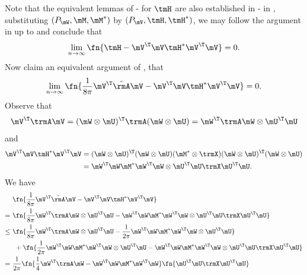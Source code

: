 \begin{proofof}{}
Note that the equivalent lemmas of -  for $\tmH$ are also established in  -  in , substituting $(P_\mW, \mM, \mM^*)$ by $(P_\mV, \tmH, \tmH^*)$, we may follow the argument in  up to  and conclude that
\begin{equation}
\label{eqn:H-equal-VTVHVTV}
    \lim_{n\to\infty}\fn{\tmH-\mV^\T\mV\tmH^*\mV^\T\mV} = 0.
\end{equation}
Now claim an equivalent argument of , that
\begin{equation}
\label{eqn:VTVHVTV-equal-VTAV}
    \lim_{n\to\infty}\fn{\frac{1}{8\pi}\mV^\T\tilde{\rmA}\mV - \mV^\T\mV\tmH^*\mV^\T\mV} = 0.
\end{equation}
Observe that 
\begin{equation}
\begin{split}
\mV^\T\trmA\mV
=(\mW\otimes\mU)^\T\trmA(\mW\otimes\mU) =  \mW^\T\trmA\mW\otimes\mU^\T\mU
\end{split}
\end{equation}
and
\begin{equation}
\begin{split}
\mV^\T\mV\tmH^*\mV^\T\mV &= (\mW\otimes\mU)^\T(\mW\otimes\mU)(\mM^*\otimes\trmX)(\mW\otimes\mU)^\T(\mW\otimes\mU)\\
&=\mW^\T\mW\mM^*\mW^\T\mW\otimes\mU^\T\mU\trmX\mU^\T\mU.
\end{split}
\end{equation}
We have\begin{equation}
\label{eqn:proof-VTVHVTV-equal-VTAV}
\begin{split}
    & \fn{\frac{1}{8\pi}\mV^\T\tilde{\rmA}\mV - \mV^\T\mV\tmH^*\mV^\T\mV}\\
    =\ &\fn{\frac{1}{8\pi}\mW^\T\trmA\mW\otimes\mU^\T\mU - \mW^\T\mW\mM^*\mW^\T\mW\otimes\mU^\T\mU\trmX\mU^\T\mU}\\
    \leq\ &\fn{\frac{1}{8\pi}\mW^\T\trmA\mW\otimes\mU^\T\mU - \frac{1}{2\pi}\mW^\T\mW\mM^*\mW^\T\mW\otimes\mU^\T\mU}\\
    &\ +\fn{\frac{1}{2\pi}\mW^\T\mW\mM^*\mW^\T\mW\otimes\mU^\T\mU - \mW^\T\mW\mM^*\mW^\T\mW\otimes\mU^\T\mU\trmX\mU^\T\mU}\\
    =\ &\frac{1}{2\pi}\fn{\frac14\mW^\T\trmA\mW-\mW^\T\mW\mM^*\mW^\T\mW}\fn{\mU^\T\mU\trmX\mU^\T\mU}\\

\end{split}
\end{equation}
\end{proofof}
